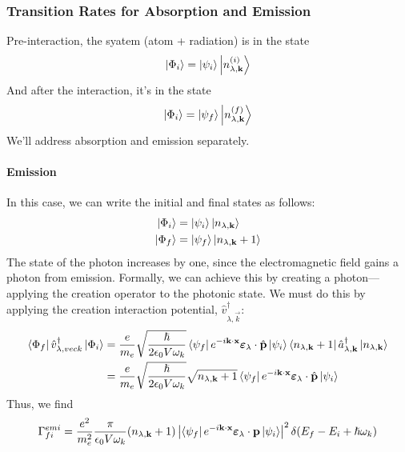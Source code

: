 \documentclass[a4paper]{article}
\begin{document}
\subsubsection{Transition Rates for Absorption and Emission}
Pre-interaction, the syatem (atom + radiation) is in the state
\[
	\left\lvert \Phi_i\right\rangle = \left\lvert \psi_i\right\rangle\left\lvert n^{(i)}_{\lambda,\boldsymbol{\mathbf{k}}}\right\rangle
\]
And after the interaction, it's in the state
\[
	\left\lvert \Phi_i\right\rangle = \left\lvert \psi_f\right\rangle\left\lvert n^{(f)}_{\lambda,\boldsymbol{\mathbf{k}}}\right\rangle
\]
We'll address absorption and emission separately.
\paragraph{Emission}
In this case, we can write the initial and final states as follows:
\begin{align*}
	\left\lvert \Phi_i\right\rangle &= \left\lvert \psi_i\right\rangle\left\lvert n_{\lambda,\boldsymbol{\mathbf{k}}}\right\rangle\\
	\left\lvert \Phi_f\right\rangle &= \left\lvert \psi_f\right\rangle\left\lvert n_{\lambda,\boldsymbol{\mathbf{k}}}+1\right\rangle
\end{align*}
The state of the photon increases by one, since the electromagnetic field gains
a photon from emission. Formally, we can achieve this by creating a
photon---applying the creation operator to the photonic state. We must do this
by applying the creation interaction potential,
$\hat{v}^\dagger_{\lambda,\vec{k}}$:
\begin{align*}
	\left\langle \Phi_f \right\rvert\hat{v}^\dagger_{\lambda,vec{k}}\left\lvert \Phi_i\right\rangle &=
		\frac{e}{m_e}\sqrt{\frac{\hslash}{2\epsilon_0V\omega_k}}
		\left\langle \psi_f \right\rvert e^{-i\boldsymbol{\mathbf{k}}\cdot\boldsymbol{\mathbf{x}}}
		\boldsymbol{\mathbf{\varepsilon}}_\lambda\cdot\hat{\boldsymbol{\mathbf{p}}}
		\left\lvert \psi_i\right\rangle \left\langle n_{\lambda,\boldsymbol{\mathbf{k}}}+1 \right\rvert
		\hat{a}^\dagger_{\lambda,\boldsymbol{\mathbf{k}}}\left\lvert n_{\lambda,\boldsymbol{\mathbf{k}}}\right\rangle\\
	&= \frac{e}{m_e}\sqrt{\frac{\hslash}{2\epsilon_0V\omega_k}}
		\sqrt{n_{\lambda,\boldsymbol{\mathbf{k}}}+1}
		\left\langle \psi_f \right\rvert e^{-i\boldsymbol{\mathbf{k}}\cdot\boldsymbol{\mathbf{x}}}
		\boldsymbol{\mathbf{\varepsilon}}_\lambda\cdot\hat{\boldsymbol{\mathbf{p}}}
		\left\lvert \psi_i\right\rangle\\
\end{align*}
Thus, we find
\[
	\Gamma_{fi}^{emi} = \frac{e^2}{m_e^2} \frac{\pi}{\epsilon_0V\omega_k}
		(n_{\lambda,\boldsymbol{\mathbf{k}}}+1)
		\left\lvert 
			\left\langle \psi_f \right\rvert e^{-i\boldsymbol{\mathbf{k}} \cdot \boldsymbol{\mathbf{x}}}
			\boldsymbol{\mathbf{\varepsilon}}_\lambda \cdot \boldsymbol{\mathbf{p}} \left\lvert \psi_i\right\rangle
		\right\rvert^2 \delta(E_f - E_i + \hslash\omega_k)
\]
\end{document}
